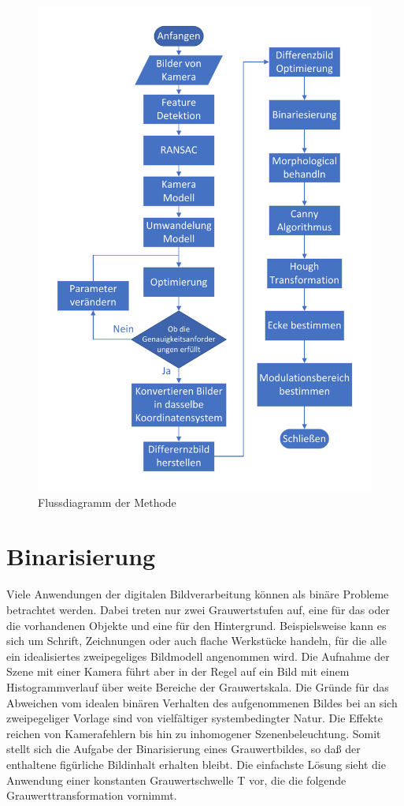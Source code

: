 \begin{figure}[H]
 \centering 
 \includegraphics[keepaspectratio,width=1.0\textwidth]{images/4_ZweiteErfahrung/Flussdiagrammsum.pdf}
 \caption{Flussdiagramm der Methode}
 \label{fig:Flussdiagramm der zweite Methode}
\end{figure}

\section{Binarisierung}

Viele Anwendungen der digitalen Bildverarbeitung können als binäre Probleme betrachtet werden. Dabei treten nur zwei Grauwertstufen auf, eine für das oder
die vorhandenen Objekte und eine für den Hintergrund. Beispielsweise kann es sich um Schrift, Zeichnungen oder auch flache Werkstücke handeln, für die alle ein
idealisiertes zweipegeliges Bildmodell angenommen wird. Die Aufnahme der Szene mit einer Kamera führt aber in der Regel auf ein Bild mit einem Histogrammverlauf über weite Bereiche der Grauwertskala. Die Gründe für das Abweichen
vom idealen binären Verhalten des aufgenommenen Bildes bei an sich zweipegeliger Vorlage sind von vielfältiger systembedingter Natur. Die Effekte reichen von Kamerafehlern bis hin zu inhomogener Szenenbeleuchtung.
Somit stellt sich die Aufgabe der Binarisierung eines Grauwertbildes, so daß der enthaltene figürliche Bildinhalt erhalten bleibt. Die einfachste Lösung sieht die Anwendung einer konstanten Grauwertschwelle T vor, die die folgende Grauwerttransformation
vornimmt.

